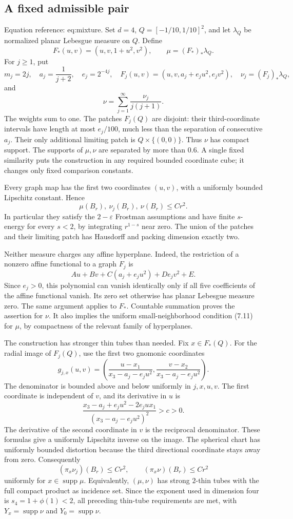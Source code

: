 \documentclass[10pt]{article}
\begin{document}
\subsection*{A fixed admissible pair}
Equation reference: eq:mixture. Set \(d=4\), \(Q=[-1/10,1/10]^2\), and let \(\lambda_Q\) be normalized planar Lebesgue measure on \(Q\). Define \[F_*(u,v)=(u,v,1+u^2,v^2),\qquad
 \mu=(F_*)_*\lambda_Q.\] For \(j\ge1\), put \[m_j=2j,\quad a_j=\frac1{j+2},\quad e_j=2^{-4j},\quad
 F_j(u,v)=(u,v,a_j+e_j u^2,e_j v^2),
 \quad \nu_j=(F_j)_*\lambda_Q,\] and \[
 \nu=\sum_{j=1}^{\infty}\frac{\nu_j}{j(j+1)}.\] The weights sum to one. The patches \(F_j(Q)\) are disjoint: their third-coordinate intervals have length at most \(e_j/100\), much less than the separation of consecutive \(a_j\). Their only additional limiting patch is \(Q\times\{(0,0)\}\). Thus \(\nu\) has compact support. The supports of \(\mu,\nu\) are separated by more than \(0.6\). A single fixed similarity puts the construction in any required bounded coordinate cube; it changes only fixed comparison constants.\par
Every graph map has the first two coordinates \((u,v)\), with a uniformly bounded Lipschitz constant. Hence \[\mu(B_r),\ \nu_j(B_r),\ \nu(B_r)\le C r^2.\] In particular they satisfy the \(2-\varepsilon\) Frostman assumptions and have finite \(s\)-energy for every \(s<2\), by integrating \(r^{1-s}\) near zero. The union of the patches and their limiting patch has Hausdorff and packing dimension exactly two.\par
Neither measure charges any affine hyperplane. Indeed, the restriction of a nonzero affine functional to a graph \(F_j\) is \[Au+Bv+C(a_j+e_j u^2)+D e_jv^2+E.\] Since \(e_j>0\), this polynomial can vanish identically only if all five coefficients of the affine functional vanish. Its zero set otherwise has planar Lebesgue measure zero. The same argument applies to \(F_*\). Countable summation proves the assertion for \(\nu\). It also implies the uniform small-neighborhood condition (7.11) for \(\mu\), by compactness of the relevant family of hyperplanes.\par
The construction has stronger thin tubes than needed. Fix \(x\in F_*(Q)\). For the radial image of \(F_j(Q)\), use the first two gnomonic coordinates \[g_{j,x}(u,v)=
 \left(\frac{u-x_1}{x_3-a_j-e_j u^2},
       \frac{v-x_2}{x_3-a_j-e_j u^2}\right).\] The denominator is bounded above and below uniformly in \(j,x,u,v\). The first coordinate is independent of \(v\), and its derivative in \(u\) is \[\frac{x_3-a_j+e_j u^2-2e_jux_1}
      {(x_3-a_j-e_j u^2)^2}>c>0.\] The derivative of the second coordinate in \(v\) is the reciprocal denominator. These formulas give a uniformly Lipschitz inverse on the image. The spherical chart has uniformly bounded distortion because the third directional coordinate stays away from zero. Consequently \[(\pi_x\nu_j)(B_r)\le C r^2,\qquad
 (\pi_x\nu)(B_r)\le C r^2\] uniformly for \(x\in\operatorname{supp}\mu\). Equivalently, \((\mu,\nu)\) has strong \(2\)-thin tubes with the full compact product as incidence set. Since the exponent used in dimension four is \(s_4=1+\phi(1)<2\), all preceding thin-tube requirements are met, with \(Y_x=\operatorname{supp}\nu\) and \(Y_0=\operatorname{supp}\nu\).\par
\end{document}
